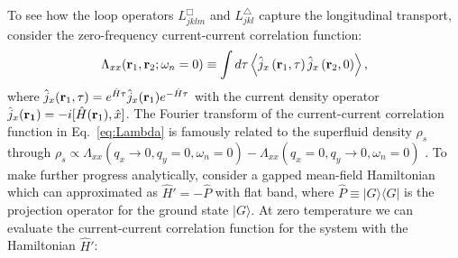 \documentclass[amsmath,amssymb, aps, prl, twocolumn]{revtex4-1}
\begin{document}
To see how the loop operators $L^\Box_{jklm}$ and $ L^\triangle_{jkl}$ capture the longitudinal transport, consider the zero-frequency current-current correlation function:  
\begin{equation}
\Lambda_{xx}({\bf r}_1,{\bf r}_2;\omega_n=0)\equiv\int d\tau\left\langle \hat{j}_x\left({\bf r}_1, \tau \right) \hat{j}_x\left({\bf r}_2, 0 \right)\right\rangle,
\label{eq:Lambda}
\end{equation}
where $\hat{j}_x({\bf r}_1,\tau)=e^{\hat{H}\tau} \hat{j}_x({\bf r}_1) e^{-\hat{H}\tau}$ with the current density operator $\hat{j}_x({\bf r_1})= -i[\hat{H}({\bf r}_1),\hat{x}]$. The Fourier transform of the 
current-current correlation function in Eq.~\eqref{eq:Lambda} is famously related to the superfluid density $\rho_s$ through $\rho_s\propto \Lambda_{xx}(q_x\!\rightarrow\! 0,q_y\!=\!0,\omega_n\!=\!0)-\Lambda_{xx}(q_x\!=\!0,q_y\!\rightarrow\!0,\omega_n\!=\!0)$ \cite{Scalapino1993, Scalapino1992}. 
To make further progress analytically, consider 
a gapped mean-field Hamiltonian which can approximated as $\hat{H}'=-\hat{P}$ with flat band, where
$\hat{P}\equiv |G\rangle \langle G|$ is the projection operator for the ground state $|G\rangle$. At zero temperature we can evaluate the current-current correlation function for the system with the Hamiltonian $\hat{H}'$:
\end{document}
